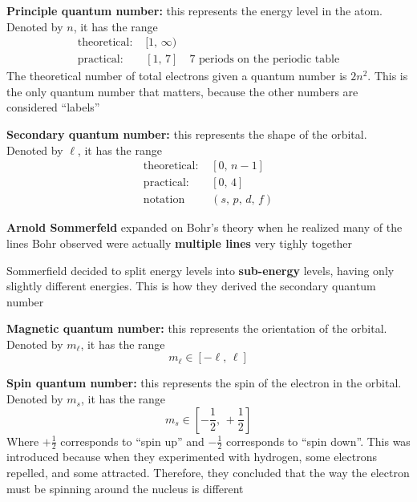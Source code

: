 \begin{enum}
    \item \textbf{Principle quantum number:} this represents the energy level in the atom.
        Denoted by $n$, it has the range
        \begin{align*}
            \text{theoretical: }&[1,\,\infty)\\
            \text{practical: }&[1,\,7]\quad\text{7 periods on the periodic table}
        \end{align*}
        The theoretical number of total electrons given a quantum number is $2n^2$. This is the 
        only quantum number that matters, because the other numbers are considered ``labels''
    \item \textbf{Secondary quantum number:} this represents the shape of the orbital.
        Denoted by $\ell$, it has the range 
        \begin{align*}
            \text{theoretical: }&[0,\,n-1]\\
            \text{practical: }&[0,\,4]\\
            \text{notation }&(s,\,p,\,d,\,f)
        \end{align*}
        \begin{bulleted-list}
            \item \textbf{Arnold Sommerfeld} expanded on Bohr's theory when he realized many
                of the lines Bohr observed were actually \textbf{multiple lines} very tighly
                together
            \item Sommerfield decided to split energy levels into \textbf{sub-energy} levels,
                having only slightly different energies. This is how they derived the secondary 
                quantum number
        \end{bulleted-list}
    \item \textbf{Magnetic quantum number:} this represents the orientation of the orbital. Denoted
        by $m_\ell$, it has the range
        \[
            m_\ell\in[-\ell,\,\ell]
        \]
    \item \textbf{Spin quantum number:} this represents the spin of the electron in the orbital.
        Denoted by $m_s$, it has the range
        \[
            m_s\in[-\frac{1}{2},\,+\frac{1}{2}]
        \]
        Where $+\frac{1}{2}$ corresponds to ``spin up'' and $-\frac{1}{2}$ corresponds to
        ``spin down''. This was introduced because when they experimented with hydrogen, some
        electrons repelled, and some attracted. Therefore, they concluded that the way the electron
        must be spinning around the nucleus is different
\end{enum}
